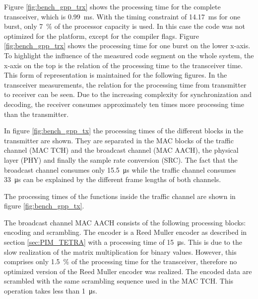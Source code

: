 Figure \ref{fig:bench_gpp_trx} shows the processing time for the complete transceiver, which is \SI{0.99}{ms}. With the timing constraint of \SI{14.17}{ms} for one burst, only \SI{7}{\%} of the processor capacity is used. In this case the code was not optimized for the platform, except for the compiler flags. Figure \ref{fig:bench_gpp_trx} shows the processing time for one burst on the lower x-axis. To highlight the influence of the measured code segment on the whole system, the x-axis on the top is the relation of the processing time to the transceiver time. This form of representation is maintained for the following figures. In the transceiver measurements, the relation for the processing time from transmitter to receiver can be seen. Due to the increasing complexity for synchronization and decoding, the receiver consumes approximately ten times more processing time than the transmitter.


In figure \ref{fig:bench_gpp_tx} the processing times of the different blocks in the transmitter are shown. They are separated in the \ac{MAC} blocks of the traffic channel (MAC TCH) and the broadcast channel (MAC AACH), the physical layer (PHY) and finally the sample rate conversion (SRC). The fact that the broadcast channel consumes only \SI{15.5}{\micro s} while the traffic channel consumes \SI{33}{\micro s} can be explained by the different frame lengths of both channels.

The processing times of the functions inside the traffic channel are shown in figure \ref{fig:bench_gpp_tx}. 

The broadcast channel MAC AACH consists of the following processing blocks: encoding and scrambling. The encoder is a Reed Muller encoder as described in section \ref{sec:PIM_TETRA} with a processing time of \SI{15}{\micro s}. This is due to the slow realization of the matrix multiplication for binary values. However, this comprises only \SI{1.5}{\%} of the processing time for the transceiver, therefore no optimized version of the Reed Muller encoder was realized. The encoded data are scrambled with the same scrambling sequence used in the MAC TCH. This operation takes less than \SI{1}{\micro s}.


